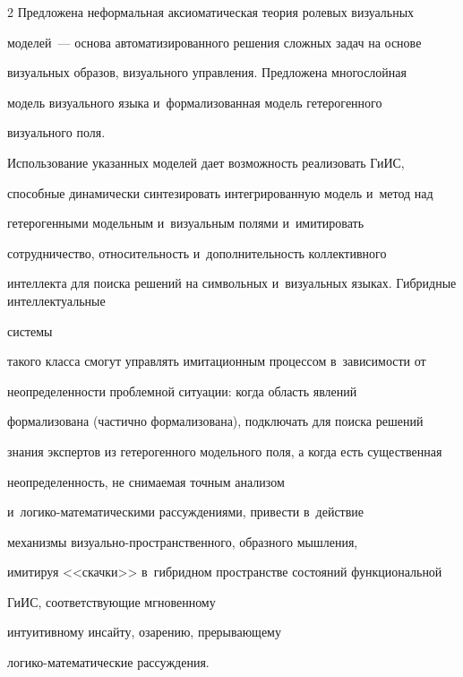 \begin{multicols}{2}
  Предложена неформальная аксиоматическая тео\-рия ролевых визуальных 


моделей~--- основа автоматизированного решения сложных задач на основе 


визуальных образов, визуального управления. Предложена многослойная 


модель визуального языка и~формализованная модель гетерогенного 


визуального поля.


  


  Использование указанных моделей дает возможность реализовать ГиИС, 


способные динамически синтезировать интегрированную модель и~метод над 


гетерогенными модельным и~визуальным полями и~имитировать 


сотрудничество, относительность и~дополнительность коллективного 


интеллекта для поиска решений на символьных и~визуальных языках. Гибридные интеллектуальные


сис\-те\-мы 


такого класса смогут управ\-лять имитационным процессом в~зависимости от 


неопределенности проблемной ситуации: когда область явлений 


формализована (частично формализована), подключать для поиска решений 


знания экспертов из гетерогенного модельного поля, а когда есть существенная 


неопределенность, не сни\-ма\-емая точным анализом 


  и~ло\-ги\-ко-ма\-те\-ма\-ти\-че\-ски\-ми рассуждениями, привести в~действие 


механизмы ви\-зу\-аль\-но-про\-стран\-ст\-вен\-но\-го, образного мышления, 


имитируя <<скачки>> в~гибридном пространстве состояний функциональной 


ГиИС, соответству\-ющие мгновенному 


интуитивному инсайту, озарению, прерывающему  


ло\-ги\-ко-ма\-те\-ма\-ти\-че\-ские рассуждения.


  


{\small\frenchspacing


 {%




}}
\end{multicols}
